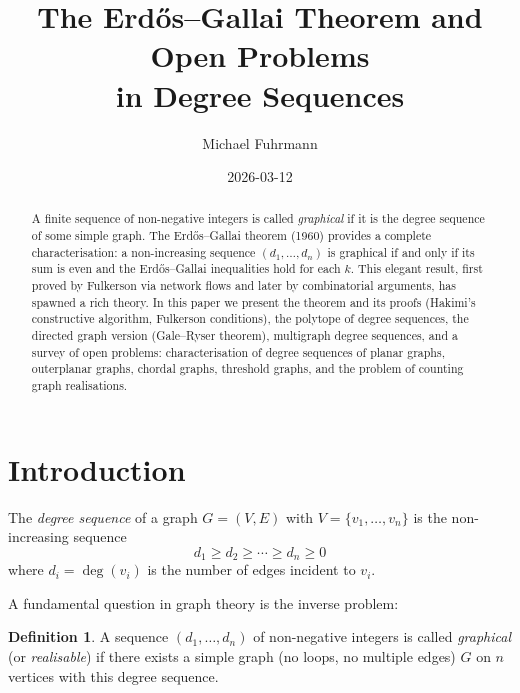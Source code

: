 \documentclass[12pt,a4paper]{amsart}
\theoremstyle{definition}
\newtheorem{definition}[theorem]{Definition}
\theoremstyle{remark}
\begin{document}
\title{The Erd\H{o}s--Gallai Theorem and Open Problems\\
in Degree Sequences}

\author{Michael Fuhrmann}
\address{Specialist Mathematics Project, Build 168}
\date{2026-03-12}

\begin{abstract}
A finite sequence of non-negative integers is called \emph{graphical} if it
is the degree sequence of some simple graph.
The Erd\H{o}s--Gallai theorem (1960) provides a complete characterisation:
a non-increasing sequence $(d_1, \ldots, d_n)$ is graphical if and only if
its sum is even and the Erd\H{o}s--Gallai inequalities hold for each $k$.
This elegant result, first proved by Fulkerson via network flows and later
by combinatorial arguments, has spawned a rich theory.
In this paper we present the theorem and its proofs (Hakimi's constructive
algorithm, Fulkerson conditions), the polytope of degree sequences, the
directed graph version (Gale--Ryser theorem), multigraph degree sequences,
and a survey of open problems: characterisation of degree sequences of planar
graphs, outerplanar graphs, chordal graphs, threshold graphs, and the problem
of counting graph realisations.
\end{abstract}

\maketitle

\tableofcontents

\section{Introduction}

The \emph{degree sequence} of a graph $G = (V, E)$ with $V = \{v_1, \ldots, v_n\}$
is the non-increasing sequence
\[
  d_1 \geq d_2 \geq \cdots \geq d_n \geq 0
\]
where $d_i = \deg(v_i)$ is the number of edges incident to $v_i$.

A fundamental question in graph theory is the inverse problem:

\begin{definition}
A sequence $(d_1, \ldots, d_n)$ of non-negative integers is called
\emph{graphical} (or \emph{realisable}) if there exists a simple graph
(no loops, no multiple edges) $G$ on $n$ vertices with this degree sequence.
\end{definition}
\end{document}
